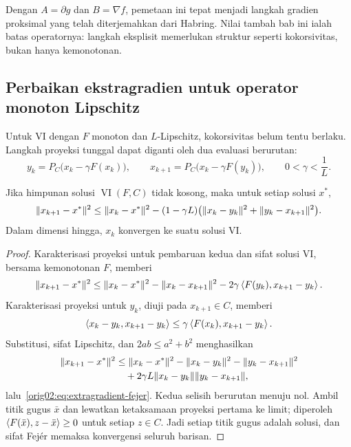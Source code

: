 Dengan $A=\partial g$ dan $B=\nabla f$, pemetaan ini tepat menjadi langkah
gradien proksimal yang telah diterjemahkan dari Habring. Nilai tambah bab ini
ialah batas operatornya: langkah eksplisit memerlukan struktur seperti
kokorsivitas, bukan hanya kemonotonan.

\subsection{Perbaikan ekstragradien untuk operator monoton Lipschitz}
\label{orig02:section:extragradient}

Untuk VI dengan $F$ monoton dan $L$-Lipschitz, kokorsivitas belum tentu
berlaku. Langkah proyeksi tunggal dapat diganti oleh dua evaluasi berurutan:
\begin{equation}
  \label{orig02:eq:extragradient}
  y_k=P_C\bigl(x_k-\gamma F(x_k)\bigr),
  \qquad
  x_{k+1}=P_C\bigl(x_k-\gamma F(y_k)\bigr),
  \qquad 0<\gamma<\frac1L.
\end{equation}

\begin{theorem}
  \label{orig02:theorem:extragradient}
  Jika himpunan solusi $\operatorname{VI}(F,C)$ tidak kosong, maka untuk
  setiap solusi $x^*$,
  \begin{equation}
    \label{orig02:eq:extragradient-fejer}
    \|x_{k+1}-x^*\|^2
    \leq\|x_k-x^*\|^2
    -(1-\gamma L)
      \bigl(\|x_k-y_k\|^2+\|y_k-x_{k+1}\|^2\bigr).
  \end{equation}
  Dalam dimensi hingga, $x_k$ konvergen ke suatu solusi VI.
\end{theorem}
\begin{proof}
  Karakterisasi proyeksi untuk pembaruan kedua dan sifat solusi VI, bersama
  kemonotonan $F$, memberi
  \begin{equation}
    \|x_{k+1}-x^*\|^2
    \leq\|x_k-x^*\|^2-\|x_k-x_{k+1}\|^2
       -2\gamma\left\langle F(y_k) , x_{k+1}-y_k\right\rangle.
  \end{equation}
  Karakterisasi proyeksi untuk $y_k$, diuji pada $x_{k+1}\in C$, memberi
  \begin{equation}
    \left\langle x_k-y_k , x_{k+1}-y_k\right\rangle
    \leq\gamma\left\langle F(x_k) , x_{k+1}-y_k\right\rangle.
  \end{equation}
  Substitusi, sifat Lipschitz, dan
  $2ab\leq a^2+b^2$ menghasilkan
  \begin{equation}
  \begin{aligned}
    \|x_{k+1}-x^*\|^2
    &\leq\|x_k-x^*\|^2
      -\|x_k-y_k\|^2-\|y_k-x_{k+1}\|^2\\
    &\quad+2\gamma L\|x_k-y_k\|\|y_k-x_{k+1}\|,
  \end{aligned}
  \end{equation}
  lalu~\eqref{orig02:eq:extragradient-fejer}. Kedua selisih berurutan menuju
  nol. Ambil titik gugus $\bar x$ dan lewatkan ketaksamaan proyeksi pertama ke
  limit; diperoleh
  $\left\langle F(\bar x) , z-\bar x\right\rangle\geq0$ untuk setiap $z\in C$. Jadi setiap titik
  gugus adalah solusi, dan sifat Fej\'er memaksa konvergensi seluruh barisan.
\end{proof}

